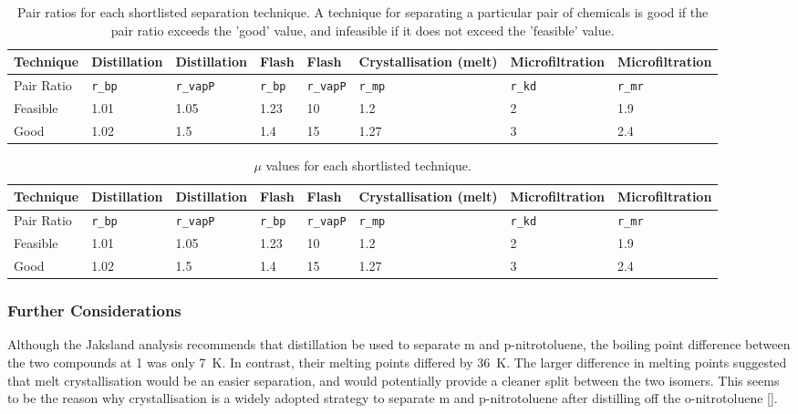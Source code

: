 \begin{landscape}
\begin{table}[H]
\centering
\caption{Pair ratios for each shortlisted separation technique. A technique for separating a particular pair of chemicals is good if the pair ratio exceeds the 'good' value, and infeasible if it does not exceed the 'feasible' value.}
\label{tab:separation-pair-ratio}
\begin{tabular}{llllllll}
\toprule
Technique  & Distillation & Distillation & Flash & Flash   & Crystallisation (melt) & Microfiltration & Microfiltration \\ \midrule
Pair Ratio & \texttt{r\_bp}        & \texttt{r\_vapP}      & \texttt{r\_bp} & \texttt{r\_vapP} & \texttt{r\_mp}                  & \texttt{r\_kd}           & \texttt{r\_mr}           \\
Feasible   & 1.01         & 1.05         & 1.23  & 10      & 1.2                    & 2               & 1.9             \\
Good       & 1.02         & 1.5          & 1.4   & 15      & 1.27                   & 3               & 2.4             \\ \bottomrule
\end{tabular}
\end{table}


\begin{table}[h]
\centering
\caption{$\mu$ values for each shortlisted technique.}
\label{tab:separation-mu}
\begin{tabular}{llllllll}
\toprule
Technique  & Distillation   & Distillation     & Flash          & Flash            & Crystallisation (melt) & Microfiltration & Microfiltration \\ \midrule
Pair Ratio & \texttt{r\_bp} & \texttt{r\_vapP} & \texttt{r\_bp} & \texttt{r\_vapP} & \texttt{r\_mp}         & \texttt{r\_kd}  & \texttt{r\_mr}  \\
Feasible   & 1.01           & 1.05             & 1.23           & 10               & 1.2                    & 2               & 1.9             \\
Good       & 1.02           & 1.5              & 1.4            & 15               & 1.27                   & 3               & 2.4             \\ \bottomrule
\end{tabular}
\end{table}

\subsubsection{Further Considerations}
Although the Jaksland analysis recommends that distillation be used to separate m and p-nitrotoluene, the boiling point difference between the two compounds at \SI{1}{\atm} was only \SI{7}{\K}. In contrast, their melting points differed by \SI{36}{\K}. The larger difference in melting points suggested that melt crystallisation would be an easier separation, and would potentially provide a cleaner split between the two isomers. This seems to be the reason why crystallisation is a widely adopted strategy to separate m and p-nitrotoluene after distilling off the o-nitrotoluene []. 

\end{landscape}